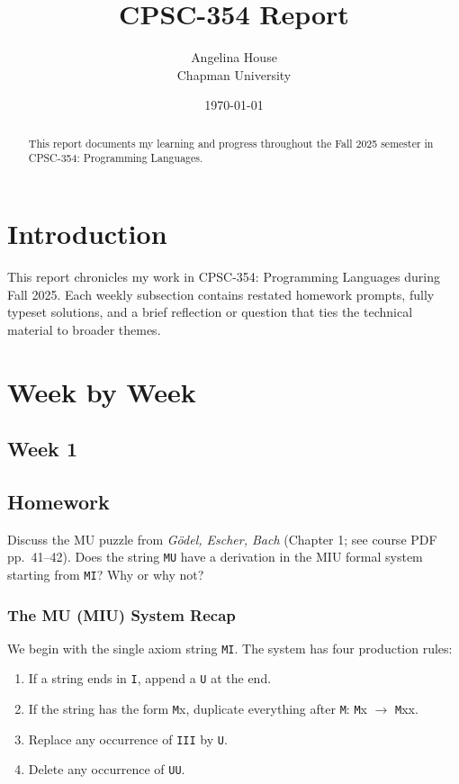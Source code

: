 \documentclass{article}
\title{CPSC-354 Report}
\author{ Angelina House  \\ Chapman University}
\date{\today}
\theoremstyle{theorem}
\theoremstyle{definition}
\theoremstyle{remark}
\begin{document}
\maketitle

\begin{abstract}
This report documents my learning and progress throughout the Fall 2025 semester in CPSC-354: Programming Languages. 
\end{abstract}

\setcounter{tocdepth}{3}
\tableofcontents


\section{Introduction}\label{intro}

This report chronicles my work in CPSC-354: Programming Languages during Fall 2025. Each weekly subsection contains restated homework prompts, fully typeset solutions, and a brief reflection or question that ties the technical material to broader themes.



\section{Week by Week}\label{homework}

\subsection{Week 1}\label{sec:week1}
\smallskip

\subsection*{Homework}
Discuss the MU puzzle from \emph{Gödel, Escher, Bach} (Chapter 1; see course PDF pp.~41--42). Does the string \texttt{MU} have a derivation in the MIU formal system starting from \texttt{MI}? Why or why not?

\subsubsection*{The MU (MIU) System Recap}
We begin with the single axiom string \texttt{MI}. The system has four production rules:
\begin{enumerate}
  \item If a string ends in \texttt{I}, append a \texttt{U} at the end.
  \item If the string has the form \texttt{M}x, duplicate everything after \texttt{M}: \texttt{M}x $\to$ \texttt{M}xx.
  \item Replace any occurrence of \texttt{III} by \texttt{U}.
  \item Delete any occurrence of \texttt{UU}.
\end{enumerate}
\end{document}
